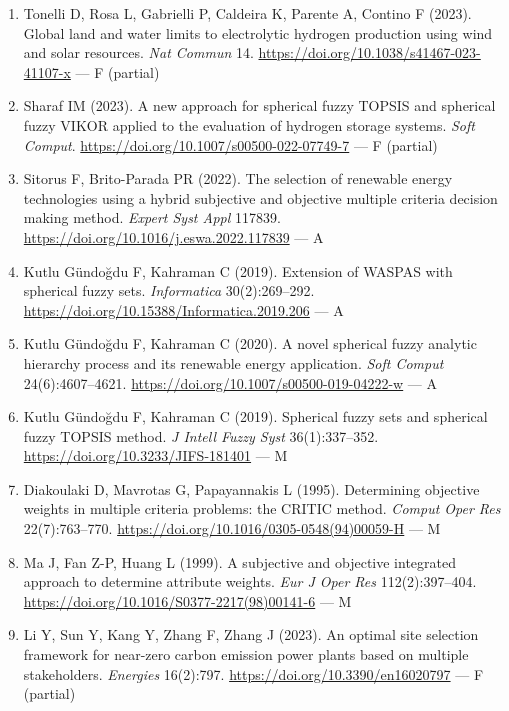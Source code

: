 \documentclass[11pt,a4paper]{article}
\begin{document}
\begin{enumerate}
  \item Tonelli D, Rosa L, Gabrielli P, Caldeira K, Parente A, Contino F (2023). Global land and water limits to electrolytic hydrogen production using wind and solar resources. \textit{Nat Commun} 14. \url{https://doi.org/10.1038/s41467-023-41107-x} --- F (partial)

  \item Sharaf IM (2023). A new approach for spherical fuzzy TOPSIS and spherical fuzzy VIKOR applied to the evaluation of hydrogen storage systems. \textit{Soft Comput}. \url{https://doi.org/10.1007/s00500-022-07749-7} --- F (partial)

  \item Sitorus F, Brito-Parada PR (2022). The selection of renewable energy technologies using a hybrid subjective and objective multiple criteria decision making method. \textit{Expert Syst Appl} 117839. \url{https://doi.org/10.1016/j.eswa.2022.117839} --- A

  \item Kutlu Gündoğdu F, Kahraman C (2019). Extension of WASPAS with spherical fuzzy sets. \textit{Informatica} 30(2):269--292. \url{https://doi.org/10.15388/Informatica.2019.206} --- A

  \item Kutlu Gündoğdu F, Kahraman C (2020). A novel spherical fuzzy analytic hierarchy process and its renewable energy application. \textit{Soft Comput} 24(6):4607--4621. \url{https://doi.org/10.1007/s00500-019-04222-w} --- A

  \item Kutlu Gündoğdu F, Kahraman C (2019). Spherical fuzzy sets and spherical fuzzy TOPSIS method. \textit{J Intell Fuzzy Syst} 36(1):337--352. \url{https://doi.org/10.3233/JIFS-181401} --- M

  \item Diakoulaki D, Mavrotas G, Papayannakis L (1995). Determining objective weights in multiple criteria problems: the CRITIC method. \textit{Comput Oper Res} 22(7):763--770. \url{https://doi.org/10.1016/0305-0548(94)00059-H} --- M

  \item Ma J, Fan Z-P, Huang L (1999). A subjective and objective integrated approach to determine attribute weights. \textit{Eur J Oper Res} 112(2):397--404. \url{https://doi.org/10.1016/S0377-2217(98)00141-6} --- M

  \item Li Y, Sun Y, Kang Y, Zhang F, Zhang J (2023). An optimal site selection framework for near-zero carbon emission power plants based on multiple stakeholders. \textit{Energies} 16(2):797. \url{https://doi.org/10.3390/en16020797} --- F (partial)


\end{enumerate}
\end{document}
